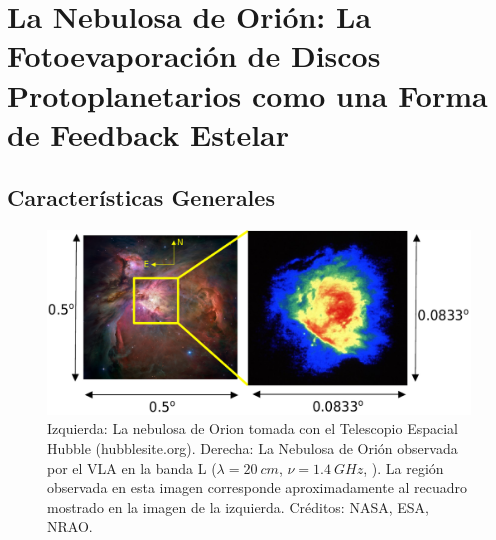 \chapter[La Nebulosa de Orión]{La Nebulosa de Orión: La Fotoevaporación de Discos Protoplanetarios como una Forma de Feedback Estelar}
\thispagestyle{empty}
\label{chap:ONC}
\section{Características Generales}
\begin{figure}
  \centering
    \includegraphics[width=\linewidth]{./Figures/orion-HST-NRAO} 
    \caption{Izquierda: La nebulosa de Orion tomada con el Telescopio Espacial Hubble (hubblesite.org). Derecha: La Nebulosa de Orión observada por el VLA en la banda L ($\lambda = \SI{20}{cm}$, $\nu = \SI{1.4}{GHz}$, \citet{Yusef:1990}). La región observada en esta imagen corresponde aproximadamente al recuadro mostrado en la imagen de la izquierda. Créditos: NASA, ESA, NRAO.}
    \label{fig:orion-pretty}
\end{figure}

